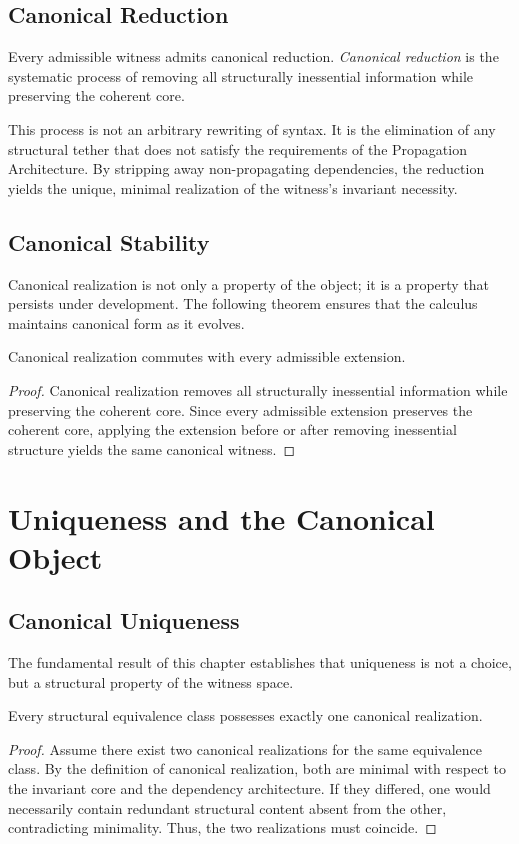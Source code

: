 \documentclass[12pt,anyside]{book}
\begin{document}
\subsection{Canonical Reduction}
Every admissible witness admits canonical reduction. \textit{Canonical reduction} is the systematic process of removing all structurally inessential information while preserving the coherent core.

This process is not an arbitrary rewriting of syntax. It is the elimination of any structural tether that does not satisfy the requirements of the Propagation Architecture. By stripping away non-propagating dependencies, the reduction yields the unique, minimal realization of the witness's invariant necessity.

\subsection{Canonical Stability}
Canonical realization is not only a property of the object; it is a property that persists under development. The following theorem ensures that the calculus maintains canonical form as it evolves.

\begin{theorem}
Canonical realization commutes with every admissible extension.
\end{theorem}
\begin{proof}
Canonical realization removes all structurally inessential information while preserving the coherent core. Since every admissible extension preserves the coherent core, applying the extension before or after removing inessential structure yields the same canonical witness.
\end{proof}

\section{Uniqueness and the Canonical Object}

\subsection{Canonical Uniqueness}
The fundamental result of this chapter establishes that uniqueness is not a choice, but a structural property of the witness space.

\begin{theorem}
Every structural equivalence class possesses exactly one canonical realization.
\end{theorem}
\begin{proof}
Assume there exist two canonical realizations for the same equivalence class. By the definition of canonical realization, both are minimal with respect to the invariant core and the dependency architecture. If they differed, one would necessarily contain redundant structural content absent from the other, contradicting minimality. Thus, the two realizations must coincide.
\end{proof}
\end{document}
